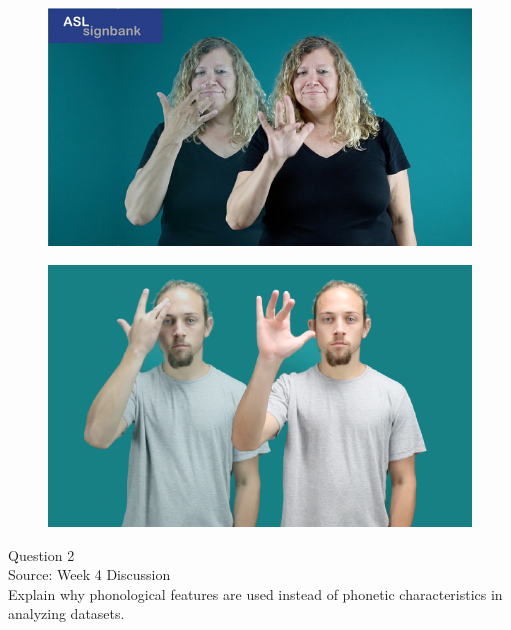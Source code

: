 \documentclass[12pt]{article}
\begin{document}
\begin{figure}[H]
\includegraphics{../images/asl_lucky.png}
\end{figure}
\begin{figure}[H]
\includegraphics{../images/asl_smart.png}
\end{figure}

\newpage

{\large Question 2}\\

Source: Week 4 Discussion\\

Explain why phonological features are used instead of phonetic characteristics in analyzing datasets.\\


\newpage

\begin{center}
\textbf{{\color{red}{\HUGE END OF EXAM}}}\\

\end{center}
\newpage
\end{document}
